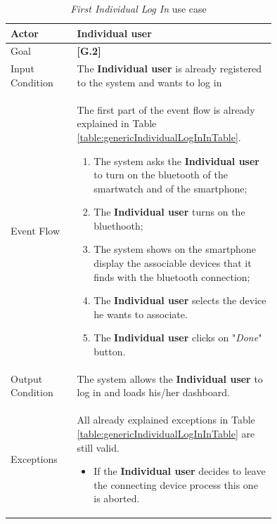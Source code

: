 \begin{center}
\begin{table}
\begin{tabular}{ | l | p{0.75\linewidth} | }
  \hline
    Actor & \textbf{Individual user} \\ \hline
    Goal & \textbf{[G.2]} \\ \hline
    Input Condition & The \textbf{Individual user} is already registered to the system and wants to log in \\ \hline
    Event Flow & \begin{minipage}[t]{0.7\textwidth}
      The first part of the event flow is already explained in Table \ref{table:genericIndividualLogInInTable}.
      \smallskip
      \begin{enumerate}
        \item The system asks the \textbf{Individual user} to turn on the bluetooth of the smartwatch and of the smartphone;
        \item The \textbf{Individual user} turns on the bluethooth;
        \item The system shows on the smartphone display the associable devices that it finds with the bluetooth connection;
        \item The \textbf{Individual user} selects the device he wants to associate.
        \item The \textbf{Individual user} clicks on "\textit{Done}" button.
      \end{enumerate}
    \smallskip
  \end{minipage} \\ \hline
  Output Condition & The system allows the \textbf{Individual user} to log in and loads his/her dashboard. \\ \hline
  Exceptions & \begin{minipage}[t]{0.7\textwidth}
    All already explained exceptions in Table \ref{table:genericIndividualLogInInTable} are still valid.
    \begin{itemize}
      \smallskip
      \item If the \textbf{Individual user} decides to leave the connecting device process this one is aborted.
    \end{itemize}
    \smallskip
  \end{minipage}  \\ \hline
\end{tabular}
\caption{\textit{First Individual Log In} use case}
\label{table:firstIndividualLogInInTable}
\end{table}
\end{center}

